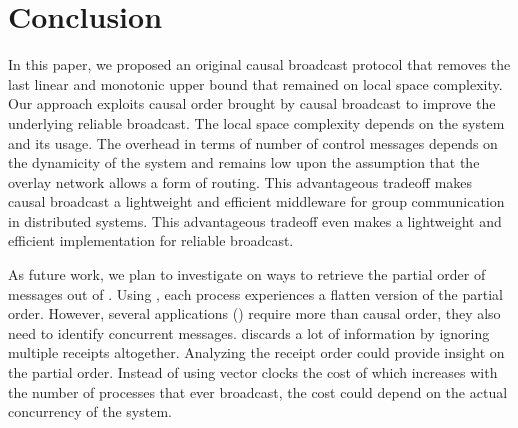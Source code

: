 
\section{Conclusion}
\label{sec:conclusion}


In this paper, we proposed an original causal broadcast protocol that removes
the last linear and monotonic upper bound that remained on local space
complexity. Our approach exploits causal order brought by causal broadcast to
improve the underlying reliable broadcast. The local space complexity depends on
the system and its usage. The overhead in terms of number of control messages
depends on the dynamicity of the system and remains low upon the assumption that
the overlay network allows a form of routing.
This advantageous tradeoff makes causal broadcast a lightweight and efficient
middleware for group communication in distributed systems. This advantageous
tradeoff even makes \RPCBROADCAST a lightweight and efficient implementation for
reliable broadcast. %

As future work, we plan to investigate on ways to retrieve the partial order of
messages out of \RPCBROADCAST. Using \RPCBROADCAST, each process experiences a
flatten version of the partial order. However, several applications (\REF)
require more than causal order, they also need to identify concurrent
messages. \RPCBROADCAST discards a lot of information by ignoring multiple
receipts altogether. Analyzing the receipt order could provide insight on the
partial order. Instead of using vector clocks the cost of which increases with
the number of processes that ever broadcast, the cost could depend on the actual
concurrency of the system.

